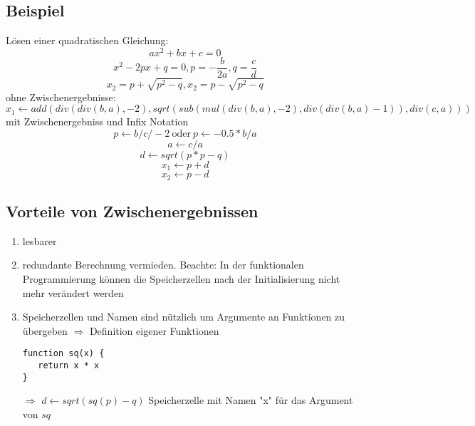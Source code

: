 \documentclass[a4paper]{scrartcl}
\begin{document}
\subsection{Beispiel}
\label{sec-7-1}
Lösen einer quadratischen Gleichung:
\[ax^2 + bx + c = 0\]
\[x^2 - 2px + q = 0, p = -\frac{b}{2a},q=\frac{c}{d}\]
\[x_2 = p + \sqrt{p^2 - q},x_2 = p - \sqrt{p^2 - q}\]
ohne Zwischenergebnisse:
\[x_1 \leftarrow add(div(div(b,a),-2),sqrt(sub(mul(div(b,a),-2),div(div(b,a)-1)),div(c,a)))\]
mit Zwischenergebniss und Infix Notation
\[p\leftarrow b / c / -2~\text{oder}~p\leftarrow -0.5 * b / a\]
\[a\leftarrow c / a\]
\[d\leftarrow sqrt(p*p - q)\]
\[x_1\leftarrow p + d\]
\[x_2\leftarrow p - d\]
\subsection{Vorteile von Zwischenergebnissen}
\label{sec-7-2}
\begin{enumerate}
\item lesbarer
\item redundante Berechnung vermieden. Beachte: In der funktionalen Programmierung können die Speicherzellen nach der Initialisierung nicht mehr verändert werden
\item Speicherzellen und Namen sind nützlich um Argumente an Funktionen zu übergeben $\Rightarrow$ Definition eigener Funktionen
\begin{verbatim}
function sq(x) {
   return x * x
}
\end{verbatim}
$\Rightarrow$ $d \leftarrow sqrt(sq(p) - q)$
Speicherzelle mit Namen "x" für das Argument von $sq$
\end{enumerate}
\end{document}
